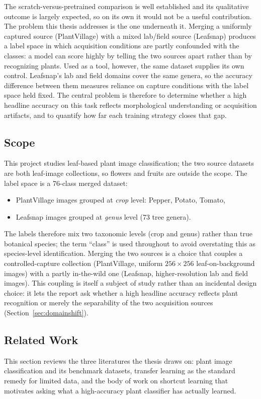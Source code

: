 \documentclass[12pt,a4paper]{article}
\begin{document}
The scratch-versus-pretrained comparison is well established and its qualitative outcome is largely expected, so on its own it would not be a useful contribution. The problem this thesis addresses is the one underneath it. Merging a uniformly captured source (PlantVillage) with a mixed lab/field source (Leafsnap) produces a label space in which acquisition conditions are partly confounded with the classes: a model can score highly by telling the two sources apart rather than by recognizing plants. Used as a tool, however, the same dataset supplies its own control. Leafsnap's lab and field domains cover the same genera, so the accuracy difference between them measures reliance on capture conditions with the label space held fixed. The central problem is therefore to determine whether a high headline accuracy on this task reflects morphological understanding or acquisition artifacts, and to quantify how far each training strategy closes that gap.

\subsection{Scope}
This project studies leaf-based plant image classification; the two source datasets are both leaf-image collections, so flowers and fruits are outside the scope. The label space is a 76-class merged dataset:
\begin{itemize}
    \item PlantVillage images grouped at \emph{crop} level: Pepper, Potato, Tomato,
    \item Leafsnap images grouped at \emph{genus} level (73 tree genera).
\end{itemize}
The labels therefore mix two taxonomic levels (crop and genus) rather than true botanical species; the term ``class'' is used throughout to avoid overstating this as species-level identification. Merging the two sources is a choice that couples a controlled-capture collection (PlantVillage, uniform $256 \times 256$ leaf-on-background images) with a partly in-the-wild one (Leafsnap, higher-resolution lab and field images). This coupling is itself a subject of study rather than an incidental design choice: it lets the report ask whether a high headline accuracy reflects plant recognition or merely the separability of the two acquisition sources (Section~\ref{sec:domainshift}).

\subsection{Related Work}
This section reviews the three literatures the thesis draws on: plant image classification and its benchmark datasets, transfer learning as the standard remedy for limited data, and the body of work on shortcut learning that motivates asking what a high-accuracy plant classifier has actually learned.
\end{document}
